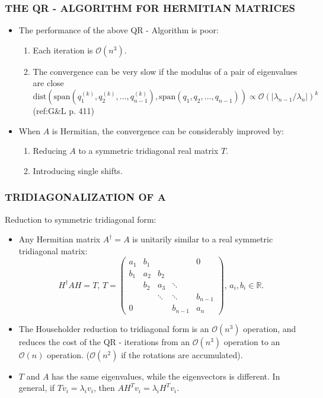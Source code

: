 \documentclass[a4paper,8pt]{beamer} %
\begin{document}
\begin{frame}[label=framelb1]  %
\frametitle{THE QR - ALGORITHM FOR HERMITIAN MATRICES }
\begin{itemize}
\item The performance of the above QR - Algorithm is poor:
	\begin{enumerate}
		\item Each iteration is $\mathcal O(n^3)$.
		\item The convergence can be very slow if the modulus of a pair of eigenvalues are close
		\[ \text{dist}(\text{span}(q_1^{(k)},q_2^{(k)},\dots,q_{n-1}^{(k)})
		,\text{span}(q_1,q_2,\dots,q_{n-1})) \propto \mathcal O(|\lambda_{n-1}/\lambda_n|)^k \]
		(ref:G\&L p. 411)	
		\hyperlink{dist span}{\beamergotobutton{(*)}}
	\end{enumerate}
\item When $A$ is Hermitian, the convergence can be considerably improved by:
	\begin{enumerate}
		\item Reducing $A$ to a symmetric tridiagonal real matrix $T$.
		\item Introducing single shifts. 
	\end{enumerate}
\end{itemize}
\end{frame} %

\begin{frame}[label=tridiagonalizationofa]  %
\frametitle{TRIDIAGONALIZATION OF A}
Reduction to symmetric tridiagonal form:
\begin{itemize}
	\item Any Hermitian matrix $A^\dagger = A$ is unitarily similar to a real symmetric tridiagonal matrix:
\begin{equation}
H^\dagger AH = T,\, 
T=
	\left(
	\begin{matrix}
		a_1 & b_1 & & & 0\\
		b_1 & a_2 & b_2 & & \\
		& b_2 & a_3 & \ddots & \\
		& & \ddots	& \ddots & b_{n-1} \\
		0& & & b_{n-1}& a_n 
	\end{matrix}
	\right),
	\, a_i, b_i \in \mathbb R.
\end{equation}
	\item
		The Householder reduction to tridiagonal form is an $\mathcal O(n^3)$ operation, and reduces the cost of the 
		QR - iterations from an $\mathcal O(n^3)$ operation to an $\mathcal O(n)$ operation. 
		($\mathcal O(n^2)$ if the rotations are accumulated).
	\item 
		$T$ and $A$ has the same eigenvalues, while the eigenvectors 
		is different. In general, if $Tv_i = \lambda_iv_i$, then $A H^T v_i = \lambda_i H^Tv_i$.
\end{itemize}	
\begin{footnotesize}
	\hyperlink{householders explained}{\beamergotobutton{(*)}} 
\end{footnotesize}
\end{frame} %
\end{document}
